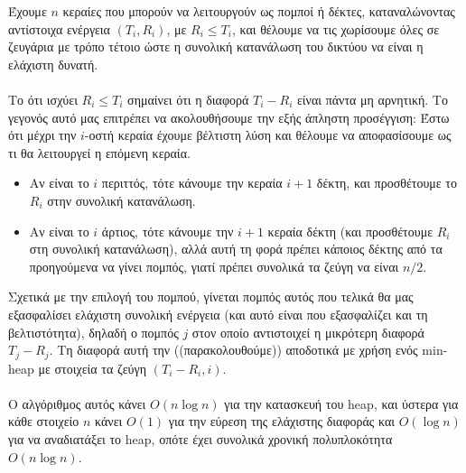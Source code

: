 \documentclass[12pt,a4paper]{article}
\begin{document}
    Έχουμε \( n \) κεραίες που μπορούν να  λειτουργούν ως πομποί ή δέκτες,
    καταναλώνοντας αντίστοιχα ενέργεια \( (T_i, R_i) \), με \( R_i \le T_i \),
    και θέλουμε να τις χωρίσουμε όλες σε ζευγάρια με τρόπο τέτοιο ώστε η
    συνολική κατανάλωση του δικτύου να είναι η ελάχιστη δυνατή.\\
    \\
    Το ότι ισχύει \( R_i \le T_i \) σημαίνει ότι η διαφορά \( T_i - R_i \)
    είναι πάντα μη αρνητική. Το γεγονός αυτό μας επιτρέπει να ακολουθήσουμε την
    εξής άπληστη προσέγγιση: Έστω ότι μέχρι την \( i \)-οστή
    κεραία έχουμε βέλτιστη λύση και θέλουμε να αποφασίσουμε ως τι θα 
    λειτουργεί η επόμενη κεραία.
    \begin{itemize}
      \item Αν είναι το \( i \) περιττός, τότε κάνουμε 
            την κεραία \( i + 1 \) δέκτη, και προσθέτουμε το \( R_i \) στην
            συνολική κατανάλωση.
      \item Αν είναι το \( i \) άρτιος, τότε κάνουμε την \( i + 1 \) κεραία
            δέκτη (και προσθέτουμε \( R_i \) στη συνολική κατανάλωση), αλλά αυτή
            τη φορά πρέπει κάποιος δέκτης από τα προηγούμενα να
            γίνει πομπός, γιατί πρέπει συνολικά τα ζεύγη να είναι \( n/2 \).
    \end{itemize}
    Σχετικά με την επιλογή του πομπού, γίνεται πομπός αυτός που τελικά θα μας
    εξασφαλίσει ελάχιστη συνολική ενέργεια (και αυτό είναι που εξασφαλίζει και
    τη βελτιστότητα), δηλαδή ο πομπός \( j \) στον οποίο αντιστοιχεί η μικρότερη
    διαφορά \( T_j - R_j \). Τη διαφορά αυτή την ((παρακολουθούμε)) αποδοτικά
    με χρήση ενός {\latintext min-heap} με στοιχεία τα ζεύγη \( (Τ_i - R_i,
    i) \).\\
    \\
    O αλγόριθμος αυτός κάνει \( Ο(n\log{n}) \) για την κατασκευή του {\latintext
    heap}, και ύστερα για κάθε στοιχείο \( n \) κάνει \( O(1) \) για την
    εύρεση της ελάχιστης διαφοράς και \( O(\log{n}) \) για να αναδιατάξει το
    {\latintext heap}, οπότε έχει συνολικά χρονική πολυπλοκότητα \( O(n\log{n})
    \).
\end{document}
